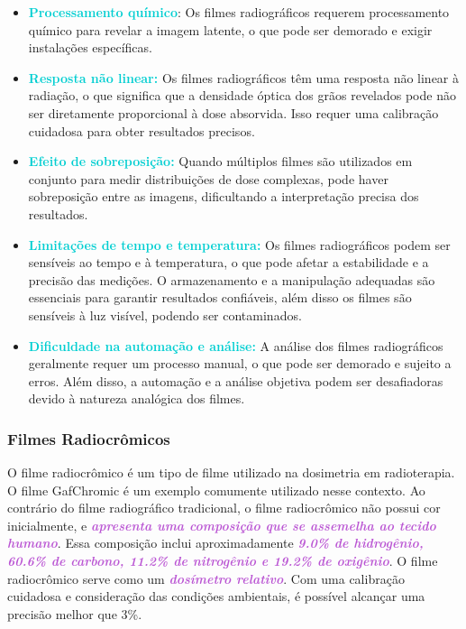 \documentclass[11pt,a4paper]{article}
\newcounter{exemplo}
\begin{document}
\begin{tcolorbox}
		\begin{itemize}[label=\textcolor{CarnationPink}{$\blacktriangleright$}]
			\item \textcolor{DarkTurquoise}{\textbf{Processamento químico}}: Os filmes radiográficos requerem processamento químico para revelar a imagem latente, o que pode ser demorado e exigir instalações específicas.
			\item \textcolor{DarkTurquoise}{\textbf{Resposta não linear:}} Os filmes radiográficos têm uma resposta não linear à radiação, o que significa que a densidade óptica dos grãos revelados pode não ser diretamente proporcional à dose absorvida. Isso requer uma calibração cuidadosa para obter resultados precisos.
			\item \textcolor{DarkTurquoise}{\textbf{Efeito de sobreposição:}} Quando múltiplos filmes são utilizados em conjunto para medir distribuições de dose complexas, pode haver sobreposição entre as imagens, dificultando a interpretação precisa dos resultados.
			\item \textcolor{DarkTurquoise}{\textbf{Limitações de tempo e temperatura:}} Os filmes radiográficos podem ser sensíveis ao tempo e à temperatura, o que pode afetar a estabilidade e a precisão das medições. O armazenamento e a manipulação adequadas são essenciais para garantir resultados confiáveis, além disso os filmes são sensíveis à luz visível, podendo ser contaminados.
			\item \textcolor{DarkTurquoise}{\textbf{Dificuldade na automação e análise:}} A análise dos filmes radiográficos geralmente requer um processo manual, o que pode ser demorado e sujeito a erros. Além disso, a automação e a análise objetiva podem ser desafiadoras devido à natureza analógica dos filmes.
		\end{itemize}

	\end{tcolorbox}

\subsubsection*{Filmes Radiocrômicos}

	O filme radiocrômico é um tipo de filme utilizado na dosimetria em radioterapia. O filme GafChromic é um exemplo comumente utilizado nesse contexto. Ao contrário do filme radiográfico tradicional, o filme radiocrômico não possui cor inicialmente, e \textcolor{MediumOrchid}{\textit{\textbf{apresenta uma composição que se assemelha ao tecido humano}}}. Essa composição inclui aproximadamente \textcolor{MediumOrchid}{\textit{\textbf{9.0\% de hidrogênio, 60.6\% de carbono, 11.2\% de nitrogênio e 19.2\% de oxigênio}}}. O filme radiocrômico serve como um \textcolor{MediumOrchid}{\textit{\textbf{dosímetro relativo}}}. Com uma calibração cuidadosa e consideração das condições ambientais, é possível alcançar uma precisão melhor que 3\%.
\end{document}

